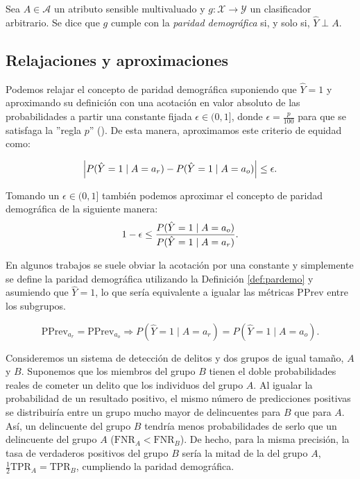 \documentclass[oneside,openright,titlepage,numbers=noenddot,openany,headinclude,footinclude=true,
cleardoublepage=empty,abstractoff,BCOR=5mm,paper=a4,fontsize=12pt,main=spanish]{scrreprt}
\begin{document}
\begin{definition} \label{def:pardemo}
Sea $A \in \mathcal{A}$ un atributo sensible multivaluado y $g\colon \mathcal{X} \to \mathcal{Y}$ un clasificador arbitrario. Se dice que $g$ cumple con la \textit{paridad demográfica} si, y solo si, $\hat{Y} \perp A.$
\end{definition}

\subsection*{Relajaciones y aproximaciones}

Podemos relajar el concepto de paridad demográfica suponiendo que $\hat{Y}=1$ y aproximando su definición con una acotación en valor absoluto de las probabilidades a partir una constante fijada $\epsilon \in (0,1]$, donde $\epsilon=\frac{p}{100}$ para que se satisfaga la ''regla $p$'' (\cite{constraints2017}). De esta manera, aproximamos este criterio de equidad como: 

\begin{equation*}
\left\lvert P(\hat{Y}=1 \mid A=a_r)-P(\hat{Y}=1 \mid A=a_o)\right\rvert \leq \epsilon.
\end{equation*}

Tomando un $\epsilon \in (0,1]$ también podemos aproximar el concepto de paridad demográfica de la siguiente manera:
\begin{equation}\label{eq:p}
   1-\epsilon \leq \frac{\displaystyle P(\hat{Y}=1 \mid A=a_o)}{\displaystyle P(\hat{Y}=1 \mid A=a_r)}. 
\end{equation}

En algunos trabajos se suele obviar la acotación por una constante y simplemente se define la paridad demográfica utilizando la Definición \ref{def:pardemo} y asumiendo que $\hat{Y}=1$, lo que sería equivalente a igualar las métricas PPrev entre los subgrupos.

\begin{equation*}
\text{PPrev}_{a_r}=\text{PPrev}_{a_o} \Rightarrow P(\hat{Y}=1 \mid A=a_r)=P(\hat{Y}=1 \mid A=a_o).
\end{equation*}

\begin{example}
Consideremos un sistema de detección de delitos y dos grupos de igual tamaño, $A$ y $B$. Suponemos que los miembros del grupo $B$ tienen el doble probabilidades reales de cometer un delito que los individuos del grupo $A$. Al igualar la probabilidad de un resultado positivo, el mismo número de predicciones positivas se distribuiría entre un grupo mucho mayor de delincuentes para $B$ que para $A$. Así, un delincuente del grupo $B$ tendría menos probabilidades de serlo que un delincuente del grupo $A$ ($\text{FNR}_A < \text{FNR}_B$). De hecho, para la misma precisión, la tasa de verdaderos positivos del grupo $B$ sería la mitad de la del grupo $A$, $\frac{1}{2} \text{TPR}_A = \text{TPR}_B$, cumpliendo la paridad demográfica.
\end{example}
\end{document}

